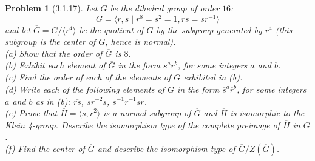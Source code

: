 \documentclass{article}
\newtheorem{problem}{Problem}
\begin{document}
\begin{problem}[3.1.17]
Let $G$ be the dihedral group of order $16$:
\[
G = \langle r, s \mid r^8 = s^2 = 1, rs = sr^{-1} \rangle
\]
and let $\overline{G} = G/\langle r^4 \rangle$ be the quotient of $G$ by the subgroup generated by $r^4$ (this subgroup is the center of $G$, hence is normal).\\
(a) Show that the order of $\overline{G}$ is $8$.\\
(b) Exhibit each element of $\overline{G}$ in the form $\overline{s}^a \overline{r}^b$, for some integers $a$ and $b$.\\
(c) Find the order of each of the elements of $\overline{G}$ exhibited in (b).\\
(d) Write each of the following elements of $\overline{G}$ in the form $\overline{s}^a \overline{r}^b$, for some integers $a$ and $b$ as in (b): $\overline{rs}$, $\overline{sr^{-2}s}$, $\overline{s^{-1}r^{-1}sr}$.\\
(e) Prove that $\overline{H} = \langle \overline{s}, \overline{r}^2 \rangle$ is a normal subgroup of $\overline{G}$ and $\overline{H}$ is isomorphic to the Klein 4-group. Describe the isomorphism type of the complete preimage of $\overline{H}$ in $G$.\\
(f) Find the center of $\overline{G}$ and describe the isomorphism type of $\overline{G}/Z(\overline{G})$.
\end{problem}
\end{document}
